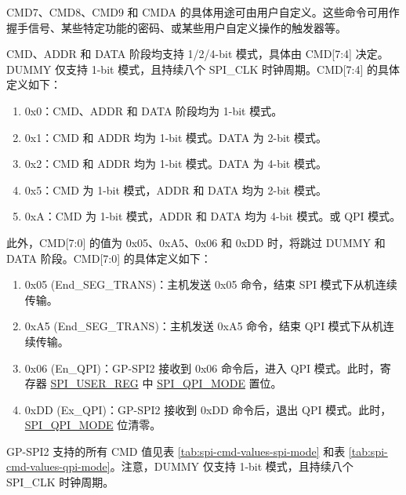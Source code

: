 \documentclass[main\_\_CN.tex]{subfiles}
\begin{document}
CMD7、CMD8、CMD9 和 CMDA 的具体用途可由用户自定义。这些命令可用作握手信号、某些特定功能的密码、或某些用户自定义操作的触发器等。

CMD、ADDR 和 DATA 阶段均支持 1/2/4-bit 模式，具体由 CMD[7:4] 决定。DUMMY 仅支持 1-bit 模式，且持续八个 SPI\_CLK 时钟周期。CMD[7:4] 的具体定义如下：

\begin{enumerate}
    \item 0x0：CMD、ADDR 和 DATA 阶段均为 1-bit 模式。
    \item 0x1：CMD 和 ADDR 均为 1-bit 模式。DATA 为 2-bit 模式。
    \item 0x2：CMD 和 ADDR 均为 1-bit 模式。DATA 为 4-bit 模式。
    \item 0x5：CMD 为 1-bit 模式，ADDR 和 DATA 均为 2-bit 模式。
    \item 0xA：CMD 为 1-bit 模式，ADDR 和 DATA 均为 4-bit 模式。或 QPI 模式。
\end{enumerate}

此外，CMD[7:0] 的值为 0x05、0xA5、0x06 和 0xDD 时，将跳过 DUMMY 和 DATA 阶段。CMD[7:0] 的具体定义如下：

\begin{enumerate}
    \item \label{other:spi-item-end-seg-trans}0x05 (End\_SEG\_TRANS)：主机发送 0x05 命令，结束 SPI 模式下从机连续传输。
    \item 0xA5 (End\_SEG\_TRANS)：主机发送 0xA5 命令，结束 QPI 模式下从机连续传输。
    \item 0x06 (En\_QPI)：GP-SPI2 接收到 0x06 命令后，进入 QPI 模式。此时，寄存器 \hyperref[regdesc:SPIUSERREG]{SPI\_USER\_REG} 中 \hyperref[fielddesc:SPIQPIMODE]{SPI\_QPI\_MODE} 置位。
    \item 0xDD (Ex\_QPI)：GP-SPI2 接收到 0xDD 命令后，退出 QPI 模式。此时， \hyperref[fielddesc:SPIQPIMODE]{SPI\_QPI\_MODE} 位清零。
\end{enumerate}


GP-SPI2 支持的所有 CMD 值见表 \ref{tab:spi-cmd-values-spi-mode} 和表 \ref{tab:spi-cmd-values-qpi-mode}。注意，DUMMY 仅支持 1-bit 模式，且持续八个 SPI\_CLK 时钟周期。
\end{document}
